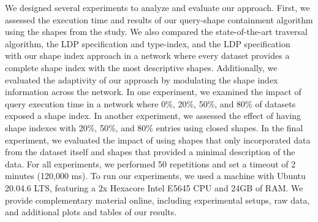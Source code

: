 We designed several experiments to analyze and evaluate our approach.
First, we assessed the execution time and results of our query-shape containment algorithm using the shapes from the study.
We also compared the state-of-the-art traversal algorithm, the LDP specification and type-index, and the LDP specification~\cite{Taelman2023} with our shape index approach in a network where every dataset provides a complete shape index with the most descriptive shapes.
Additionally, we evaluated the adaptivity of our approach by modulating the shape index information across the network.
In one experiment, we examined the impact of query execution time in a network where 0\%, 20\%, 50\%, and 80\% of datasets exposed a shape index.
In another experiment, we assessed the effect of having shape indexes with 20\%, 50\%, and 80\% entries using closed shapes.
In the final experiment, we evaluated the impact of using shapes that only incorporated data from the dataset itself and shapes that provided a minimal description of the data.
For all experiments, we performed 50 repetitions and set a timeout of 2 minutes (120,000 ms).
To run our experiments, we used a machine with Ubuntu 20.04.6 LTS, featuring a 2x Hexacore Intel E5645 CPU and 24GB of RAM.
We provide complementary material online, including experimental setups, raw data, and additional plots and tables of our results.~

\iffalse
PROVIDE LINK FOR EXPERIMENTS AND SHAPES

102x pcgen3 nodes
https://doc.ilabt.imec.be/ilabt/virtualwall/hardware.html#virtual-wall-2
\fi

